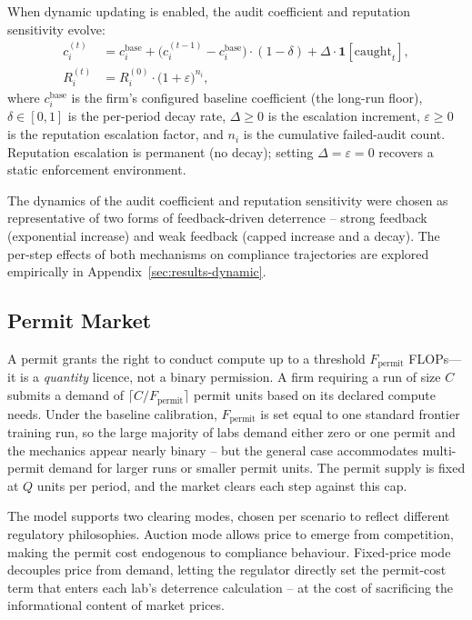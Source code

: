 When dynamic updating is enabled, the audit coefficient and reputation sensitivity evolve:
%
\begin{align}
    c_i^{(t)} &= c_i^{\mathrm{base}} + \bigl(c_i^{(t-1)} - c_i^{\mathrm{base}}\bigr)\cdot(1 - \delta) + \Delta \cdot \mathbf{1}[\text{caught}_{t}], \label{eq:coeff} \\
    R_i^{(t)} &= R_i^{(0)} \cdot \bigl(1 + \varepsilon\bigr)^{n_i}, \label{eq:rep}
\end{align}
%
where $c_i^{\mathrm{base}}$ is the firm's configured baseline coefficient (the long-run floor), $\delta \in [0,1]$ is the per-period decay rate, $\Delta \geq 0$ is the escalation increment, $\varepsilon \geq 0$ is the reputation escalation factor, and $n_i$ is the cumulative failed-audit count. Reputation escalation is permanent (no decay); setting $\Delta = \varepsilon = 0$ recovers a static enforcement environment.

The dynamics of the audit coefficient and reputation sensitivity were chosen as representative of two forms of feedback-driven deterrence -- strong feedback (exponential increase) and weak feedback (capped increase and a decay).
The per-step effects of both mechanisms on compliance trajectories are explored empirically in Appendix~\ref{sec:results-dynamic}.

\subsection{Permit Market}
A permit grants the right to conduct compute up to a threshold
$F_{\text{permit}}$ FLOPs---it is a \emph{quantity} licence, not a binary permission. A firm requiring a run of size $C$ submits a demand of $\lceil C / F_{\text{permit}} \rceil$ permit units based on its declared compute needs. Under the baseline calibration, $F_{\text{permit}}$ is set equal to one standard frontier training run, so the large majority of labs demand either zero or one permit and the mechanics appear nearly binary -- but the general case accommodates multi-permit demand for larger runs or smaller permit units. The permit supply is fixed at $Q$ units per period, and the market clears each step against this cap.

The model supports two clearing modes, chosen per scenario to reflect different regulatory philosophies. Auction mode allows price to emerge from competition, making the permit cost endogenous to compliance behaviour. Fixed-price mode decouples price from demand, letting the regulator directly set the permit-cost term that enters each lab's deterrence calculation -- at the cost of sacrificing
the informational content of market prices.

